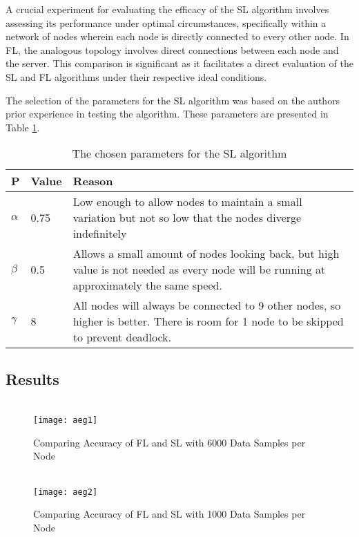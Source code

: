 A crucial experiment for evaluating the efficacy of the SL algorithm involves assessing its performance under optimal circumstances, specifically within a network of nodes wherein each node is directly connected to every other node. In FL, the analogous topology involves direct connections between each node and the server. This comparison is significant as it facilitates a direct evaluation of the SL and FL algorithms under their respective ideal conditions.

The selection of the parameters for the SL algorithm was based on the authors prior experience in testing the algorithm. These parameters are presented in Table \ref{slparamsDNP}.
\begin{table}[H]
	\begin{tabular}{p{0.5cm}|l|p{11cm}}
		P & Value & Reason \\ \hline \hline
		$\alpha$  & 0.75  & Low enough to allow nodes to maintain a small variation but not so low that the nodes diverge indefinitely                               \\ \hline
		$\beta$   & 0.5   & Allows a small amount of nodes looking back, but high value is not needed as every node will be running at approximately the same speed. \\ \hline
		$\gamma$  & 8     & All nodes will always be connected to 9 other nodes, so higher is better. There is room for 1 node to be skipped to prevent deadlock.   
	\end{tabular}
	\caption{The chosen parameters for the SL algorithm} \label{slparamsDNP}
\end{table}

\subsection{Results}

\begin{figure}[H] 
	 \\
	\texttt{[image: aeg1]}
	\caption{Comparing Accuracy of FL and SL with 6000 Data Samples per Node}
	\label{aeg1}
\end{figure}

\begin{figure}[H]
	 \\
	\texttt{[image: aeg2]}
	\caption{Comparing Accuracy of FL and SL with 1000 Data Samples per Node}
	\label{aeg2}
\end{figure}


